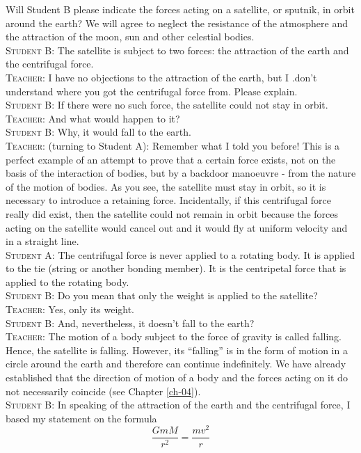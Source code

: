 \documentclass[a4paper,sfsidenotes]{tufte-book}
\begin{document}
Will Student B please indicate the forces acting on a satellite, or sputnik, in orbit around the earth? We will agree to neglect the resistance of the atmosphere and the attraction of the moon, sun and other celestial bodies.
\\
\textsc{Student B:} The satellite is subject to two forces: the attraction of the earth and the centrifugal force.
\\
\textsc{Teacher:} I have no objections to the attraction of the earth, but I .don't understand where you got the centrifugal force from. Please explain.
\\
\textsc{Student B:} If there were no such force, the satellite could not stay in orbit.
\\
\textsc{Teacher:} And what would happen to it?
\\
\textsc{Student B:} Why, it would fall to the earth.
\\
\textsc{Teacher:} (turning to Student A): Remember what I told you before! This is a perfect example of an attempt to prove that a certain force exists, not on the basis of the interaction of bodies, but by a backdoor manoeuvre - from the nature of the motion of bodies. As you see, the satellite must stay in orbit, so it is necessary to introduce a retaining force. Incidentally, if this centrifugal force really did exist, then the satellite could not remain in orbit because the forces acting on the satellite would cancel out and it would fly at uniform velocity and in a straight line.
\\
\textsc{Student A:} The centrifugal force is never applied to a rotating body. It is applied to the tie (string or another bonding member). It is the centripetal force that is applied to the rotating body.
\\
\textsc{Student B:} Do you mean that only the weight is applied to the satellite?
\\
\textsc{Teacher:} Yes, only its weight.
\\
\textsc{Student B:} And, nevertheless, it doesn't fall to the earth?
\\
\textsc{Teacher:} The motion of a body subject to the force of gravity is called falling. Hence, the satellite is falling. However, its ``falling'' is in the form of motion in a circle around the earth and therefore can continue indefinitely. We have already established that the direction of motion of a body and the forces acting on it do not necessarily coincide (see Chapter \ref{ch-04}).
\\
\textsc{Student B:} In speaking of the attraction of the earth and the centrifugal force, I based my statement on the formula 
\begin{equation}
\frac{GmM}{r^{2}} = \frac{mv^{2}}{r}
\label{eq-34}
\end{equation}
\end{document}
